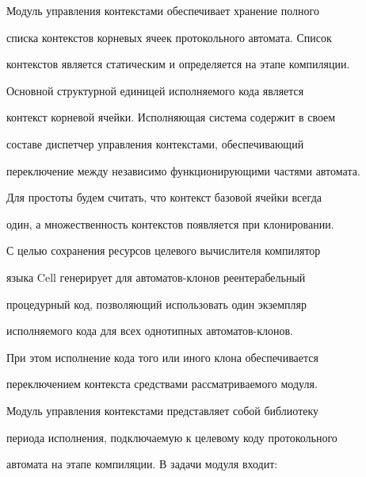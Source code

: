       




      


      Модуль управления контекстами обеспечивает хранение полного 


списка контекстов корневых ячеек протокольного автомата. Список 


контекстов является статическим и определяется на этапе компиляции. 


      


      Основной структурной единицей исполняемого кода является 


контекст корневой ячейки. Исполняющая сис\-те\-ма содержит в своем 


составе диспетчер управ\-ле\-ния контекстами, обеспечивающий 


переключение между независимо функционирующими частями автомата.   


      


      Для  простоты будем считать, что контекст базовой ячейки всегда 


один, а множественность контекстов появляется при клонировании. 


      


      С целью сохранения ресурсов целевого вычислителя компилятор 


языка Cell генерирует для автоматов-клонов реентерабельный 


процедурный код, позволяющий использовать один экземпляр 


исполняемого кода для всех однотипных ав\-то\-ма\-тов-клонов.


      


      При этом исполнение кода того или иного клона обеспечивается 


переключением контекста средствами рассматриваемого модуля.


      


      Модуль управления контекстами представляет собой библиотеку 


периода исполнения, подключаемую к целевому коду протокольного 


автомата на этапе компиляции. В задачи модуля входит:


